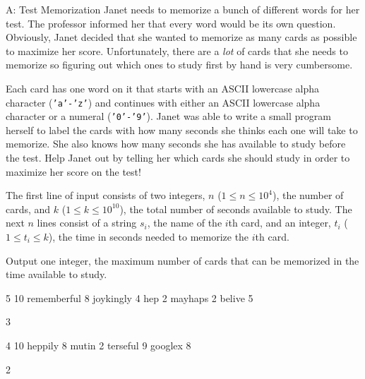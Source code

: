 \begin{problem}{A: Test Memorization}
Janet needs to memorize a bunch of different words for her test.
The professor informed her that every word would be its own question.
Obviously, Janet decided that she wanted to memorize as many cards as possible to maximize her score.
Unfortunately, there are a \textit{lot} of cards that she needs to memorize so figuring out which ones to study first by hand is very cumbersome.

Each card has one word on it that starts with an ASCII lowercase alpha character (\texttt{'a'-'z'}) and continues with either an ASCII lowercase alpha character or a numeral (\texttt{'0'-'9'}).
Janet was able to write a small program herself to label the cards with how many seconds she thinks each one will take to memorize.
She also knows how many seconds she has available to study before the test.
Help Janet out by telling her which cards she should study in order to maximize her score on the test!
\end{problem}

\begin{formalin}
The first line of input consists of two integers, $n$ ($1 \leq n \leq 10^4$), the number of cards, and $k$ ($1 \leq k \leq 10^{10}$), the total number of seconds available to study. 
The next $n$ lines consist of a string $s_i$, the name of the $i$th card, and an integer, $t_i$ ($1 \leq t_i \leq k$), the time in seconds needed to memorize the $i$th card.
\end{formalin}

\begin{formalout}
Output one integer, the maximum number of cards that can be memorized in the time available to study.
\end{formalout}

\begin{datain}
5 10
rememberful 8
joykingly 4
hep 2
mayhaps 2
belive 5
\end{datain}
\begin{dataout}
3
\end{dataout}

\begin{datain}
4 10
heppily 8
mutin 2
terseful 9
googlex 8
\end{datain}
\begin{dataout}
2
\end{dataout}